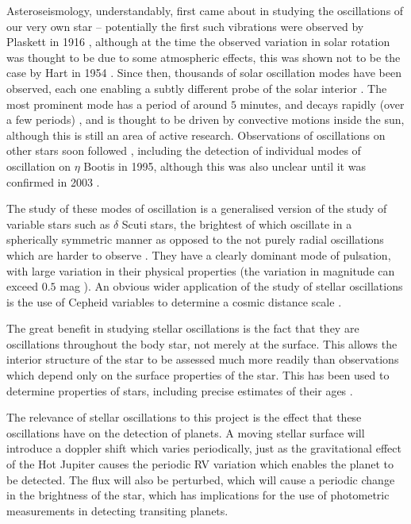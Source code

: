\documentclass[11pt]{amsart}
\begin{document}
Asteroseismology, understandably, first came about in studying the oscillations of our very own star -- potentially the first such vibrations were observed by Plaskett in 1916 \cite{Plaskett1916}, although at the time the observed variation in solar rotation was thought to be due to some atmospheric effects, this was shown not to be the case by Hart in 1954 \cite{Hart1954}.  Since then, thousands of solar oscillation modes have been observed, each one enabling a subtly different probe of the solar interior \cite{DiMauro2017}.  The most prominent mode has a period of around $5$ minutes, and decays rapidly (over a few periods) \cite{Ulrich1970},  and is thought to be driven by convective motions inside the sun, although this is still an area of active research.  Observations of oscillations on other stars soon followed \cite{Brown1991}, including the detection of individual modes of oscillation on $\eta$ Bootis in 1995, although this was also unclear until it was confirmed in 2003 \cite{Kjeldsen2003}.

The study of these modes of oscillation is a generalised version of the study of variable stars such as $\delta$ Scuti stars, the brightest of which oscillate in a spherically symmetric manner as opposed to the not purely radial oscillations which are harder to observe \cite{Garg2010}.  They have a clearly dominant mode of pulsation, with large variation in their physical properties (the variation in magnitude can exceed $0.5$ mag \cite{Garg2010}).  An obvious wider application of the study of stellar oscillations is the use of Cepheid variables to determine a cosmic distance scale \cite{Madore1991}.

The great benefit in studying stellar oscillations is the fact that they are oscillations throughout the body star, not merely at the surface.  This allows the interior structure of the star to be assessed much more readily than observations which depend only on the surface properties of the star.  This has been used to determine properties of stars, including precise estimates of their ages \cite{Chaplin2013} \cite{Cunha2007}.

The relevance of stellar oscillations to this project is the effect that these oscillations have on the detection of planets.  A moving stellar surface will introduce a doppler shift which varies periodically, just as the gravitational effect of the Hot Jupiter causes the periodic RV variation which enables the planet to be detected.  The flux will also be perturbed, which will cause a periodic change in the brightness of the star, which has implications for the use of photometric measurements in detecting transiting planets.
\end{document}
